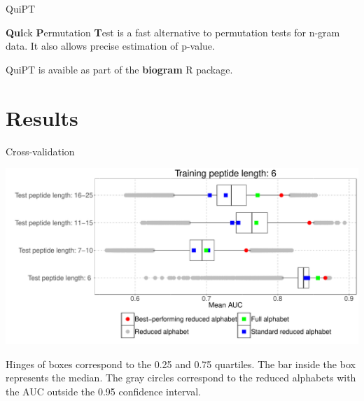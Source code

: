 \documentclass{beamer}\usepackage[]{graphicx}\usepackage[]{color}
\makeatletter
\def\maxwidth{ %
  \ifdim\Gin@nat@width>\linewidth
    \linewidth
  \else
    \Gin@nat@width
  \fi
}
\newenvironment{knitrout}{}{} %
\makeatother
\begin{document}
\begin{frame}{QuiPT}  
  
  \textbf{Qui}ck \textbf{P}ermutation \textbf{T}est is a fast alternative to permutation tests for n-gram data. It also allows precise estimation of p-value.

QuiPT is avaible as part of the \textbf{biogram} R package.
\end{frame}
  
      
\section{Results}
  
    \begin{frame}{Cross-validation}
\begin{knitrout}
\color{fgcolor}

{\centering \includegraphics[width=\maxwidth]{figure/unnamed-chunk-1-1} 

}



\end{knitrout}
  
  \tiny
Hinges of boxes correspond to 
the 0.25 and 0.75 quartiles. The bar inside the box represents the median. The 
gray circles correspond to the reduced alphabets with the AUC outside the 0.95 
confidence interval.

  
  \end{frame}
  
\end{document}
